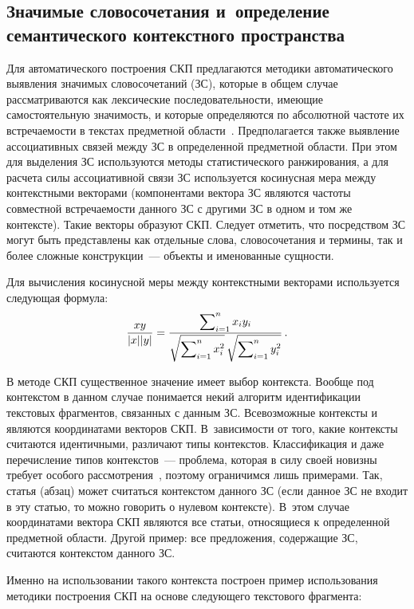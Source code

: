 \begin{multicols}{2}
    \section{Значимые словосочетания и~определение 
семантического контекстного пространства}
     
     Для автоматического построения СКП предлагаются методики 
автоматического выявления значи\-мых словосочетаний (ЗС), которые в 
общем случае рассматриваются как лексические последовательности, 
имеющие самостоятельную значимость, и которые определяются по 
абсолютной час\-то\-те их встречаемости в текстах предметной 
     об\-ласти~\cite{5-koz, 6-koz}. Предполагается также выявление 
ассоциативных связей между ЗС в определенной предметной об\-ласти. При 
этом для выделения ЗС используются методы статистического 
ранжирования, а для расчета силы ассоциативной связи ЗС используется 
косинусная мера между контекстными векторами (компонентами вектора 
ЗС являются частоты совместной встречаемости данного ЗС с другими ЗС 
в одном и том же контексте). Такие векторы образуют СКП. Следует 
отметить, что посредством ЗС могут быть представлены как отдельные 
слова, словосочетания и термины, так и более сложные конструкции~--- 
объекты и именованные сущности.
     
     Для вычисления косинусной меры между контекстными векторами 
используется следующая формула:
     $$
     \displaystyle\frac{\displaystyle xy\mathstrut}{\displaystyle \vert x\vert \vert y \vert\mathstrut} =\displaystyle\frac{\displaystyle \sum\nolimits_{i=1}^n x_i y_i\mathstrut}{\displaystyle \sqrt{\sum\nolimits_{i=1}^n x 
_i^2} \,\sqrt{\sum\nolimits_{i=1}^n y_i^2}\mathstrut}\,.
$$
    
     В методе СКП существенное значение имеет выбор контекста. 
Вообще под контекстом в данном случае понимается некий алгоритм 
идентификации текстовых фрагментов, связанных с данным ЗС. 
Всевозможные контексты и являются координатами векторов СКП. 
В~зависимости от того, какие контексты считаются идентичными, 
различают типы контекстов. Классификация и даже перечисление типов 
контекстов~--- проблема, которая в силу своей новизны требует особого 
рассмотрения~\cite{15-koz}, поэтому ограничимся лишь примерами. Так, 
\mbox{статья} (абзац) может считаться контекстом данного ЗС (если данное ЗС не 
входит в эту статью, то можно говорить о нулевом контексте). В~этом 
случае координатами вектора СКП являются все статьи, относящиеся к 
определенной предметной области. Другой пример: все предложения, 
содержащие ЗС, считаются контекстом данного ЗС. 
     
     Именно на использовании такого контекста построен пример 
использования методики по\-стро\-ения СКП на основе следующего 
текстового фрагмента:
     

\end{multicols}
